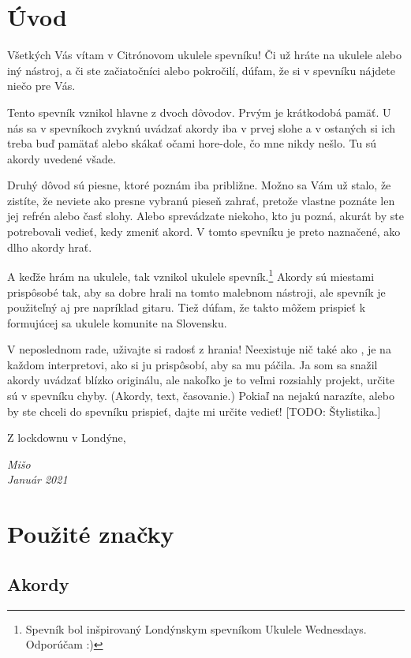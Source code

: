 \begingroup %
\setlength{\parindent}{0pt}
\setlength{\parskip}{\baselineskip}
\large

\section*{Úvod}

Všetkých Vás vítam v Citrónovom ukulele spevníku! Či už hráte na ukulele alebo iný nástroj,
a či ste začiatočníci alebo pokročilí, dúfam, že si v spevníku nájdete niečo pre Vás.

Tento spevník vznikol hlavne z dvoch dôvodov. Prvým je krátkodobá pamäť. U nás sa v spevníkoch
zvyknú uvádzať akordy iba v prvej slohe a v ostaných si ich treba buď pamätať alebo skákať očami
hore-dole, čo mne nikdy nešlo. Tu sú akordy uvedené všade.

Druhý dôvod sú piesne, ktoré poznám iba približne. Možno sa Vám už stalo, že zistíte, že neviete
ako presne vybranú pieseň zahrať, pretože vlastne poznáte len jej refrén alebo časť slohy.
Alebo sprevádzate niekoho, kto ju pozná, akurát by ste potrebovali vedieť, kedy zmeniť akord.
V tomto spevníku je preto naznačené, ako dlho akordy hrať.

A keďže hrám na ukulele, tak vznikol ukulele spevník.\footnote{Spevník bol inšpirovaný Londýnskym
spevníkom Ukulele Wednesdays. Odporúčam :)} Akordy sú miestami prispôsobé tak, aby sa dobre hrali
na tomto malebnom nástroji, ale spevník je použiteľný aj pre napríklad gitaru. Tiež dúfam,
že takto môžem prispieť k formujúcej sa ukulele komunite na Slovensku.

V neposlednom rade, uživajte si radosť z hrania! Neexistuje nič také ako , je na každom interpretovi, ako si ju prispôsobí, aby sa mu páčila. Ja som sa snažil
akordy uvádzať blízko originálu, ale nakoľko je to veľmi rozsiahly projekt, určite sú v spevníku chyby.
(Akordy, text, časovanie.) Pokiaľ na nejakú narazíte, alebo by ste chceli do spevníku prispieť, dajte
mi určite vedieť! [TODO: Štylistika.]

Z lockdownu v Londýne,

\textit{%
Mišo \\
Január 2021
}

\section*{Použité značky}

\subsection*{Akordy}

